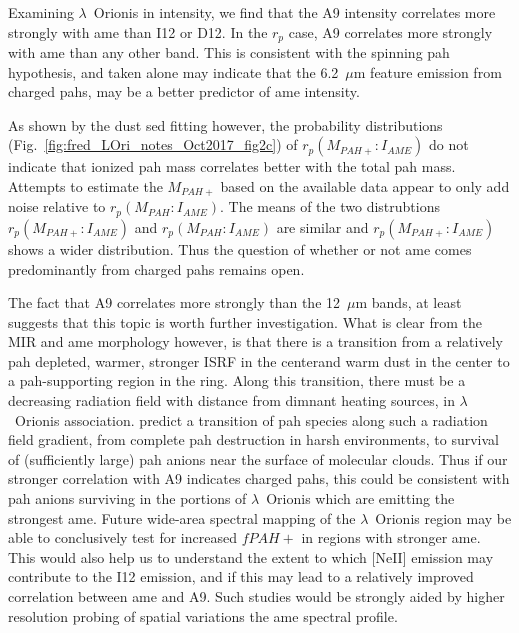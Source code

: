           Examining $\lambda$~Orionis in intensity, we find that the A9 intensity correlates more strongly with \acrshort{ame} than I12 or D12. In the $r_{p}$ case, A9 correlates more strongly with \acrshort{ame} than any other band. This is consistent with the spinning \acrshort{pah} hypothesis, and taken alone may indicate that the 6.2~$\mu$m feature emission from charged \acrshort{pah}s, may be a better predictor of \acrshort{ame} intensity.

          As shown by the dust \acrshort{sed} fitting however, the probability distributions (Fig.~\ref{fig:fred_LOri_notes_Oct2017_fig2c}) of $r_{p}(M_{PAH+}:I_{AME})$ do not indicate that ionized \acrshort{pah} mass correlates better with the total \acrshort{pah} mass. Attempts to estimate the $M_{PAH+}$ based on the available data appear to only add noise relative to $r_{p}(M_{PAH}:I_{AME})$. The means of the two distrubtions $r_{p}(M_{PAH+}:I_{AME})$  and $r_{p}(M_{PAH}:I_{AME})$ are similar and $r_{p}(M_{PAH+}:I_{AME})$ shows a wider distribution. Thus the question of whether or not \acrshort{ame} comes predominantly from charged \acrshort{pah}s remains open.

          The fact that A9 correlates more strongly than the 12~$\mu$m bands, at least suggests that this topic is worth further investigation. What is clear from the MIR and \acrshort{ame} morphology however, is that there is a transition from a relatively \acrshort{pah} depleted, warmer, stronger ISRF in the centerand warm dust in the center to a \acrshort{pah}-supporting region in the ring. Along this transition, there must be a decreasing radiation field with distance from dimnant heating sources, in $\lambda$~Orionis association. \cite{andrews16} predict a transition of \acrshort{pah} species along such a radiation field gradient, from complete \acrshort{pah} destruction in harsh environments, to survival of (sufficiently large) \acrshort{pah} anions near the surface of molecular clouds. Thus if our stronger correlation with A9 indicates charged \acrshort{pah}s, this could be consistent with \acrshort{pah} anions surviving in the portions of $\lambda$~Orionis which are emitting the strongest \acrshort{ame}. Future wide-area spectral mapping of the $\lambda$~Orionis region may be able to conclusively test for increased $fPAH+$ in regions with stronger \acrshort{ame}. This would also help us to understand the extent to which [NeII] emission may contribute to the I12 emission, and if this may lead to a relatively improved correlation between \acrshort{ame} and A9. Such studies would be strongly aided by higher resolution probing of spatial variations the \acrshort{ame} spectral profile.
